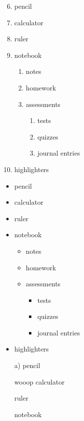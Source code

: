 \documentclass[11pt]{article}
\begin{document}
\begin{enumerate} \setcounter{enumi}{5}
\item pencil
\item calculator
\item ruler
\item notebook
    \begin{enumerate}
        \item notes
        \item homework
        \item assessments
            \begin{enumerate}
                \item tests
                \item quizzes
                \item journal entries
            \end{enumerate}
    \end{enumerate}
\item highlighters
\end{enumerate}

\vspace{1cm}

\begin{itemize}
\item pencil
\item calculator
\item ruler
\item notebook
    \begin{itemize}
        \item notes
        \item homework
        \item assessments
            \begin{itemize}
                \item tests
                \item quizzes
                \item journal entries
            \end{itemize}
    \end{itemize}
\item highlighters
\end{itemize}

\vspace{1cm}

\begin{enumerate}
\item[a)] pencil
\item[wooop] calculator
\item[] ruler
\item[] notebook
\end{enumerate}
\end{document}
